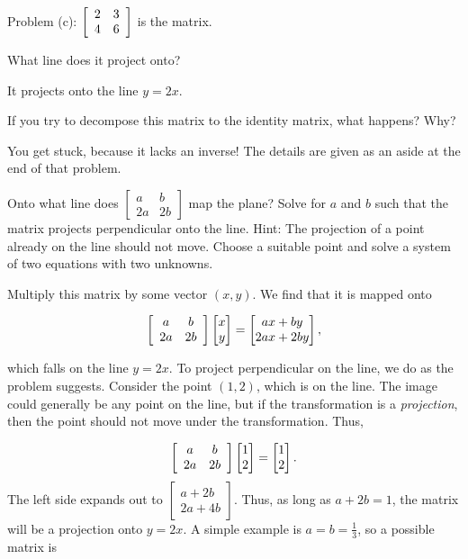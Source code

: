 \documentclass[../key.tex]{subfiles}
\begin{document}
Problem (c): $\left[\begin{array}{cc} 2 & 3 \\ 4 & 6 \end{array}\right]$ is the matrix.

\begin{inner_problem}
\item What line does it project onto?
\end{inner_problem}

It projects onto the line $y=2x$.

\begin{inner_problem}
\item If you try to decompose this matrix to the identity matrix, what happens? Why?
\end{inner_problem}

You get stuck, because it lacks an inverse! The details are given as an aside at the end of that problem.

\begin{outer_problem}
\item Onto what line does $\left[\begin{smallmatrix} a & b \\ 2a & 2b\end{smallmatrix}\right]$ map the plane? Solve for $a$ and $b$ such that the matrix projects perpendicular onto the line. Hint: The projection of a point already on the line should not move. Choose a suitable point and solve a system of two equations with two unknowns. \label{prob:project_the_plane}
\end{outer_problem}

Multiply this matrix by some vector $(x,y)$. We find that it is mapped onto

$$\left[\begin{array}{cc} a & b \\ 2a & 2b \end{array}\right]\begin{bmatrix}x \\ y\end{bmatrix} = \begin{bmatrix}ax+by \\ 2ax+2by\end{bmatrix},$$

    which falls on the line $y=2x$. To project perpendicular on the line, we do as the problem suggests. Consider the point $(1,2)$, which is on the line. The image could generally be any point on the line, but if the transformation is a \textit{projection}, then the point should not move under the transformation. Thus,

$$\left[\begin{array}{cc} a & b \\ 2a & 2b \end{array}\right]\begin{bmatrix} 1 \\ 2 \end{bmatrix} = \begin{bmatrix} 1 \\ 2 \end{bmatrix}.$$
The left side expands out to $\begin{bmatrix} a+2b \\ 2a+4b \end{bmatrix}$. Thus, as long as $a+2b=1$, the matrix will be a projection onto $y=2x$. A simple example is $a=b=\frac{1}{3}$, so a possible matrix is
\end{document}

